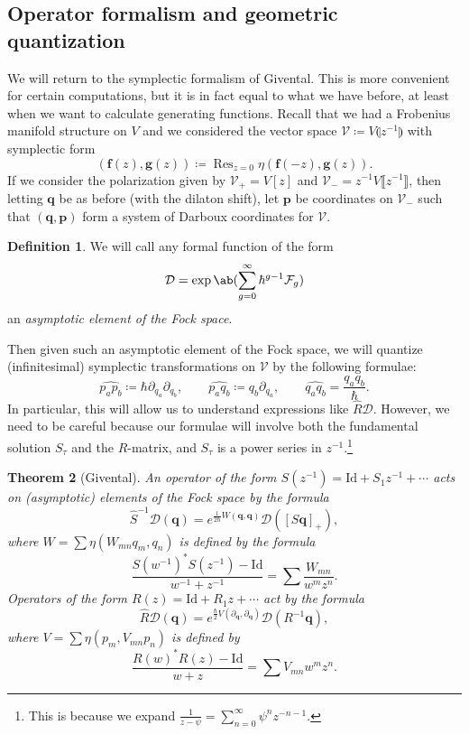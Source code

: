 \documentclass{amsart}
\newtheorem{thm}{Theorem}[section]
\theoremstyle{definition}
\newtheorem{defn}[thm]{Definition}
\theoremstyle{remark}
\theoremstyle{plain}
\theoremstyle{definition}
\theoremstyle{remark}
\newcommand{\mc}[1]{\mathcal{#1}}
\newcommand{\mbf}[1]{\mathbf{#1}}
\newcommand{\bq}{\mbf{q}}
\newcommand{\bp}{\mbf{p}}
\newcommand{\mr}[1]{\mathrm{#1}}
\newcommand{\on}[1]{\operatorname{#1}}
\newcommand{\wh}[1]{\widehat{#1}}
\newcommand{\1}{\mathbf{1}}
\newcommand{\2}{\mathbf{2}}
\newcommand{\3}{\mathbf{3}}
\newcommand{\ps}[1]{\llbracket #1 \rrbracket}
\newcommand{\ls}[1]{\llparenthesis #1 \rrparenthesis}
\begin{document}
\subsection{Operator formalism and geometric quantization}%
\label{sub:Operator formalism and geometric quantization}

We will return to the symplectic formalism of Givental. This is more convenient for certain computations, but it is in fact equal to what we have before, at least when we want to calculate generating functions. Recall that we had a Frobenius manifold structure on $V$ and we considered the vector space $\mc{V}\coloneqq V\ls{z^{-1}}$ with symplectic form
\[ (\mbf{f}(z), \mbf{g}(z)) \coloneqq \on{Res}_{z=0} \eta(\mbf{f}(-z), \mbf{g}(z)). \]
If we consider the polarization given by $\mc{V}_+ = V[z]$ and $\mc{V}_- = z^{-1}V\ps{z^{-1}}$, then letting $\bq$ be as before (with the dilaton shift), let $\bp$ be coordinates on $\mc{V}_-$ such that $(\bq, \bp)$ form a system of Darboux coordinates for $\mc{V}$.

\begin{defn}
    We will call any formal function of the form
    \[ \mc{D} = \exp\ab(\sum_{g=0}^{\infty} \hbar^{g-1} \mc{F}_g) \]
    an \textit{asymptotic element of the Fock space}.
\end{defn}

Then given such an asymptotic element of the Fock space, we will quantize (infinitesimal) symplectic transformations on $\mc{V}$ by the following formulae:
\[ \wh{p_a p_b} \coloneqq \hbar \partial_{q_a} \partial_{q_b}, \qquad \wh{p_a q_b} \coloneqq q_b \partial_{q_a}, \qquad \wh{q_a q_b} = \frac{q_a q_b}{\hbar}. \]
In particular, this will allow us to understand expressions like $\hat{R} \mc{D}$. However, we need to be careful because our formulae will involve both the fundamental solution $S_{\tau}$ and the $R$-matrix, and $S_{\tau}$ is a power series in $z^{-1}$.\footnote{This is because we expand $\frac{1}{z-\psi} = \sum_{n=0}^{\infty} \psi^n z^{-n-1}$.}

\begin{thm}[Givental]
    An operator of the form $S(z^{-1}) = \mr{Id} + S_1 z^{-1} + \cdots$ acts on (asymptotic) elements of the Fock space by the formula
    \[ \hat{S}^{-1} \mc{D}(\bq) = e^{\frac{1}{2\hbar}W(\bq,\bq)} \mc{D}([S \bq]_+), \]
    where $W = \sum \eta(W_{mn}q_m, q_n)$ is defined by the formula
    \[ \frac{S(w^{-1})^* S(z^{-1}) - \mr{Id}}{w^{-1}+z^{-1}} = \sum \frac{W_{mn}}{w^m z^n}. \]
    Operators of the form $R(z) = \mr{Id} + R_1 z + \cdots$ act by the formula
    \[ \hat{R}\mc{D}(\bq) = e^{\frac{\hbar}{2} V(\partial_{\bq}, \partial_{\bq})} \mc{D}(R^{-1} \bq), \]
    where $V = \sum \eta(p_m, V_{mn} p_n)$ is defined by 
    \[ \frac{R(w)^* R(z) - \mr{Id}}{w+z} = \sum V_{mn} w^m z^n. \]
\end{thm}
\end{document}
